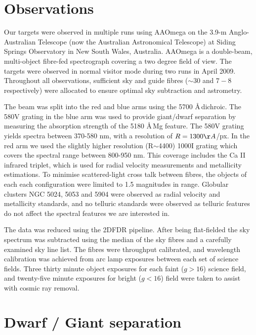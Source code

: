 \documentclass{emulateapj}
\begin{document}
	
	\section{Observations}
	\label{sec:observations}
	
	Our targets were observed in multiple runs using AAOmega on the 3.9-m Anglo-Australian Telescope (now the Australian Astronomical Telescope) at Siding Springs Observatory in New South Wales, Australia. AAOmega is a double-beam, multi-object fibre-fed spectrograph covering a two degree field of view. The targets were observed in normal visitor mode during two runs in April 2009. Throughout all observations, sufficient sky and guide fibres ($\sim 30$ and $7-8$ respectively) were allocated to ensure optimal sky subtraction and astrometry.
	
	The beam was split into the red and blue arms using the 5700 \AA\,dichroic. The 580V grating in the blue arm was used to provide giant/dwarf separation by measuring the absorption strength of the 5180 \AA\,Mg feature. The 580V grating yields spectra between 370-580 nm, with a resolution of $R = 1300 \AA$/px. In the red arm we used the slightly higher resolution (R$\sim$4400) 1000I grating which covers the spectral range between 800-950 nm. This coverage includes the Ca II infrared triplet, which is used for radial velocity measurements and metallicity estimations. To minimise scattered-light cross talk between fibres, the objects of each each configuration were limited to 1.5 magnitudes in range. Globular clusters NGC 5024, 5053 and 5904 were observed as radial velocity and metallicity standards, and no telluric standards were observed as telluric features do not affect the spectral features we are interested in.

	The data was reduced using the 2\textsc{DFDR} pipeline. After being flat-fielded the sky spectrum was subtracted using the median of the sky fibres and a carefully examined sky line list. The fibres were throughput calibrated, and wavelength calibration was achieved from arc lamp exposures between each set of science fields. Three thirty minute object exposures for each faint ($g > 16$) science field, and twenty-five minute exposures for bright ($g < 16$) field were taken to assist with cosmic ray removal.


	\section{Dwarf / Giant separation}
	\label{sec:dwarf-giant-separation}
\end{document}

